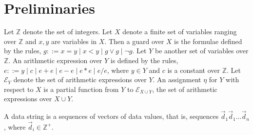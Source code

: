 \documentclass[runningheads,a4paper]{llncs}
\def\Ee{{\mathcal{E} }}
\def\Ii{{\mathbb{Z} }}
\begin{document}
\cite{CHSW15}

\section{Preliminaries}

Let $\Ii$ denote the set of integers. Let $X$ denote a finite set of variables ranging over $\Ii$ and $x,y$ are variables in $X$. Then a guard over $X$ is the formulae defined by the rules, $g::= x = y \mid x < y \mid g \vee g \mid \neg g$. Let $Y$ be another set of variables over $\Ii$. An arithmetic expression over $Y$ is defined by the rules, $e::= y \mid c \mid e + e \mid e-e \mid e * e \mid e / e$, where $y \in Y$ and $c$ is a constant over $\Ii$. Let $\Ee_Y$ denote the set of arithmetic expressions over $Y$. An assignment $\eta$ for $Y$ with respect to $X$ is a partial function from $Y$ to $\Ee_{X \cup Y}$, the set of arithmetic expressions over $X \cup Y$.

A data string is a sequences of vectors of data values, that is, sequences $\vec{d}_1\vec{d}_1\dots \vec{d}_n$, where $\vec{d}_i \in \Ii^+$.
\end{document}
